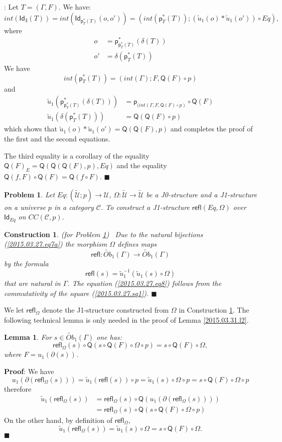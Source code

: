 \documentclass[12pt]{article}
\numberwithin{equation}{section}
\newenvironment{myproof}{{\bf Proof}:}{$\blacksquare$ \vskip 5mm }
\newtheorem{lemma}[proposition]{Lemma}
\newtheorem{problem}[proposition]{Problem}
\newtheorem{construction0}[proposition]{Construction}
\newenvironment{construction}[1]{\begin{construction0}(for Problem \ref{#1})\ }{$\blacksquare$ \end{construction0}}
\newcommand{\llabel}[1]{\label{#1}}
\newcommand{\sr}{\rightarrow}
\newcommand{\wt}{\widetilde}
\newcommand{\toCC}{CC} %
\newcommand{\C}{{\mathcal C}}  %
\newcommand{\p}{\mathsf{p}}
\newcommand{\Id}{\mathsf{Id}} %
\newcommand{\Idx}{\mathsf{Id_3}} %
\newcommand{\refl}{\mathsf{refl}}
\newcommand{\U}{\mathcal{U}}
\newcommand{\Q}{\mathsf{Q}}
\newcommand{\Obwt}{\wt{Ob}}
\begin{document}
%
\begin{myproof}
Let $T=(\Gamma,F)$. We have:
%
$$int(\Idx(T))=int(\Id_{\p_T^*(T)}(o,o'))=(int(\p_T^*(T));(\wt{u}_1(o)*\wt{u}_1(o'))\circ
Eq),$$
%
where
%
\begin{align*}
  o &=\p_{\p_T^*(T)}^*(\delta(T)) \\
  o'&=\delta(\p_T^*(T))
\end{align*}
%
We have
%
$$int(\p_T^*(T))=(int(\Gamma);F,\Q(F)\circ p)$$
%
and
%
\begin{align*}
  \wt{u}_1(\p_{\p_T^*(T)}^*(\delta(T)))&=\p_{(int(\Gamma,F, \Q(F)\circ p)}\circ \Q(F) \\
  \wt{u}_1(\delta(\p_T^*(T)))&=\Q(\Q(F)\circ p)
\end{align*}
%
which shows that $\wt{u}_1(o)*\wt{u}_1(o')=\Q(\Q(F),p)$ and completes the proof
of the first and the second equations.

The third equality is a corollary of the equality $\Q(F)_{E}=\Q(\Q(\Q(F),p),Eq)$
and the equality $\Q(f,F)\circ \Q(F)=\Q(f\circ F)$.
\end{myproof}
%
\begin{problem}
\llabel{2015.03.27.prob4} Let $Eq:(\wt{\U};p)\sr \U$, $\Omega:\wt{\U}\sr \wt{\U}$
be a J0-structure and a J1-structure on a universe $p$ in a category $\C$.
To construct a J1-structure $\refl(Eq,\Omega)$ over $\Id_{Eq}$ on $\toCC({\C},p)$.
\end{problem}
%
\begin{construction}{2015.03.27.prob4}\rm
\llabel{2015.03.27.constr4} Due to the natural bijections
(\ref{2015.03.27.eq7a}) the morphism $\Omega$ defines maps
%
$$\refl:\Obwt_1(\Gamma)\sr \Obwt_1(\Gamma)$$
%
by the formula
%
$$\refl(s)=\wt{u}_1^{-1}(\wt{u}_1(s)\circ \Omega)$$
%
that are natural in $\Gamma$. The equation (\ref{2015.03.27.eq8}) follows from
the commutativity of the square (\ref{2015.03.27.sq1}).
\end{construction}
%
We let $\refl_{\Omega}$ denote the J1-structure constructed from $\Omega$ in
Construction \ref{2015.03.27.constr4}.
%
The following technical lemma is only needed in the proof of Lemma
\ref{2015.03.31.l2}.
%
\begin{lemma}
\llabel{2015.04.02.l3} For $s\in \Obwt_1(\Gamma)$ one has:
%
$$\refl_{\Omega}(s)\circ \Q(s\circ \Q(F)\circ \Omega\circ p)=s\circ \Q(F)\circ
\Omega,$$
%
where $F=u_1(\partial(s))$.
\end{lemma}
%
\begin{myproof}
We have
%
$$u_1(\partial(\refl_{\Omega}(s)))=\wt{u}_1(\refl(s))\circ p=\wt{u}_1(s)\circ
\Omega\circ p=s\circ \Q(F)\circ \Omega\circ p$$
%
therefore
%
\begin{align*}
  \wt{u}_1(\refl_{\Omega}(s))
  & =\refl_{\Omega}(s)\circ \Q(u_1(\partial(\refl_{\Omega}(s)))) \\
  & = \refl_{\Omega}(s)\circ \Q(s\circ \Q(F)\circ \Omega\circ p)
\end{align*}
%
On the other hand, by definition of $\refl_{\Omega}$,
%
$$\wt{u}_1(\refl_{\Omega}(s))=\wt{u}_1(s)\circ \Omega=s\circ \Q(F)\circ \Omega.$$
%
\end{myproof}
\end{document}
